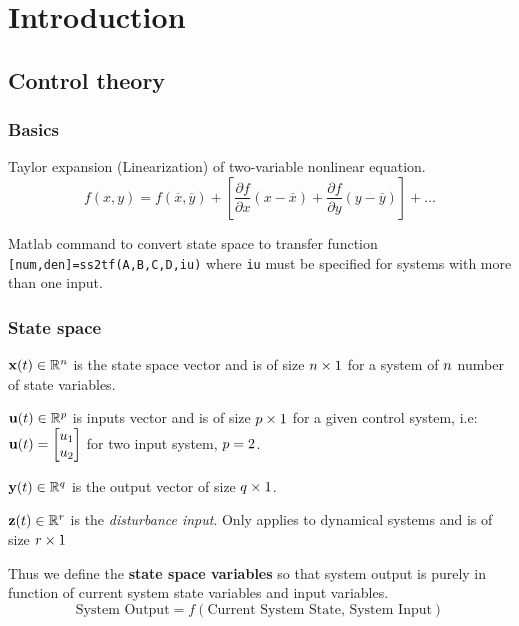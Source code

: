 
\chapter{Introduction}

\section{Control theory}
\subsection{Basics}
Taylor expansion (Linearization) of two-variable nonlinear equation.
\[
f(x,y) = f(\overline{x},\overline{y}) + \left[ \frac{\partial f}{\partial x} (x-\overline{x}) +\frac{\partial f}{\partial y} (y-\overline{y}) \right] + \ldots
\]

Matlab command to convert state space to transfer function \verb|[num,den]=ss2tf(A,B,C,D,iu)| where \verb|iu| must be specified for systems with more than one input.

\subsection{State space}
\(\mathbf{x}(t) \in \mathbb{R}^{n} \) is the state space vector and is of size \(n\times 1\) for a system of $n$ number of state variables.

\(\mathbf{u}(t)\in \mathbb{R}^{p} \) is inputs vector and is of size \(p\times 1\) for a given control system, i.e: \( \mathbf{u}(t)=\begin{bmatrix}
u_1 \\ u_2
\end{bmatrix}\) for two input system, \(p=2\).

\(\mathbf{y}(t)\in \mathbb{R}^{q}  \) is the output vector of size  \(q\times 1\).

\(\mathbf{z}(t)\in \mathbb{R}^{r} \) is the \textit{disturbance input}. Only applies to dynamical systems and is of size \(r \times 1\)

Thus we define the \textbf{state space variables} so that system output is purely in function of current system state variables and input variables.
\[
\text{System Output} = f\left( \text{Current System State, System Input} \right)
\]

